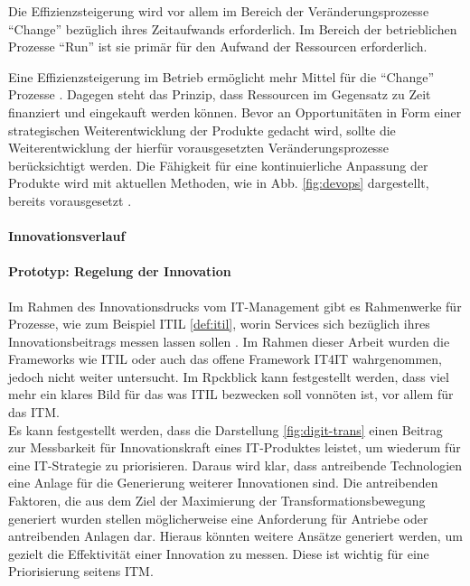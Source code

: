 \begin{enumerate}
    Die Effizienzsteigerung wird vor allem im Bereich der Veränderungsprozesse \enquote{Change} bezüglich ihres Zeitaufwands erforderlich. Im Bereich der betrieblichen Prozesse \enquote{Run} ist sie primär für den Aufwand der Ressourcen erforderlich.
    
    Eine Effizienzsteigerung im Betrieb ermöglicht mehr Mittel für die \enquote{Change} Prozesse \cite{Rausch2006}. Dagegen steht das Prinzip, dass Ressourcen im Gegensatz zu Zeit finanziert und eingekauft werden können. Bevor an Opportunitäten in Form einer strategischen Weiterentwicklung der Produkte \cite{Rausch2006} gedacht wird, sollte die Weiterentwicklung der hierfür vorausgesetzten Veränderungsprozesse berücksichtigt werden. Die Fähigkeit für eine kontinuierliche Anpassung \cite{Bussmann2006, Ganswindt2006} der Produkte wird mit aktuellen Methoden, wie in Abb. \ref{fig:devops} dargestellt, bereits vorausgesetzt \cite{Alt2017}.

\end{enumerate}

\paragraph{Innovationsverlauf}

\paragraph{Prototyp: Regelung der Innovation}
Im Rahmen des Innovationsdrucks vom IT-Management gibt es Rahmenwerke für Prozesse, wie zum Beispiel ITIL \ref{def:itil}, worin Services sich bezüglich ihres Innovationsbeitrags messen lassen sollen \cite{Alt2017}. Im Rahmen dieser Arbeit wurden die Frameworks wie ITIL oder auch das offene Framework IT4IT wahrgenommen, jedoch nicht weiter untersucht. Im Rpckblick kann festgestellt werden, dass viel mehr ein klares Bild für das was ITIL bezwecken soll vonnöten ist, vor allem für das \ac{ITM}.
\medskip
\\
Es kann festgestellt werden, dass die Darstellung \ref{fig:digit-trans} einen Beitrag zur Messbarkeit für Innovationskraft eines IT-Produktes leistet, um wiederum für eine IT-Strategie zu priorisieren. Daraus wird klar, dass antreibende Technologien eine Anlage für die Generierung weiterer Innovationen sind. Die antreibenden Faktoren, die aus dem Ziel der Maximierung der Transformationsbewegung generiert wurden stellen möglicherweise eine Anforderung für Antriebe oder antreibenden Anlagen dar. Hieraus könnten weitere Ansätze generiert werden, um gezielt die Effektivität einer Innovation zu messen. Diese ist wichtig für eine Priorisierung seitens \ac{ITM}.

